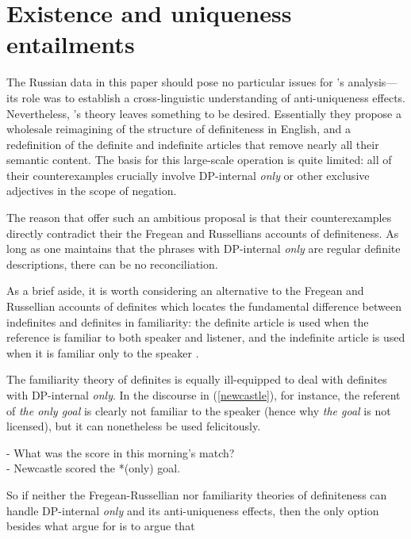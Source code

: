 \section{Existence and uniqueness entailments \label{sec:existence-and-uniqueness}}
The Russian data in this paper should pose no particular issues for \citeauthor{cb2015}'s analysis---its role was to establish a cross-linguistic understanding of anti-uniqueness effects. Nevertheless, \citeauthor{cb2015}'s theory leaves something to be desired. Essentially they propose a wholesale reimagining of the structure of definiteness in English, and a redefinition of the definite and indefinite articles that remove nearly all their semantic content. The basis for this large-scale operation is quite limited: all of their counterexamples crucially involve DP-internal \textit{only} or other exclusive adjectives in the scope of negation.

The reason that \citeauthor{cb2015} offer such an ambitious proposal is that their counterexamples directly contradict their the Fregean and Russellians accounts of definiteness. As long as one maintains that the phrases with DP-internal \textit{only} are regular definite descriptions, there can be no reconciliation.

As a brief aside, it is worth considering an alternative to the Fregean and Russellian accounts of definites which locates the fundamental difference between indefinites and definites in familiarity: the definite article is used when the reference is familiar to both speaker and listener, and the indefinite article is used when it is familiar only to the speaker \citep{heim82}.

The familiarity theory of definites is equally ill-equipped to deal with definites with DP-internal \textit{only}. In the discourse in (\ref{newcastle}), for instance, the referent of \textit{the only goal} is clearly not familiar to the speaker (hence why \textit{the goal} is not licensed), but it can nonetheless be used felicitously.

\begin{exe}
	\ex \label{newcastle} - What was the score in this morning's match? \\
	    - Newcastle scored the *(only) goal.
\end{exe}

So if neither the Fregean-Russellian nor familiarity theories of definiteness can handle DP-internal \textit{only} and its anti-uniqueness effects, then the only option besides what \citeauthor{cb2015} argue for is to argue that 

